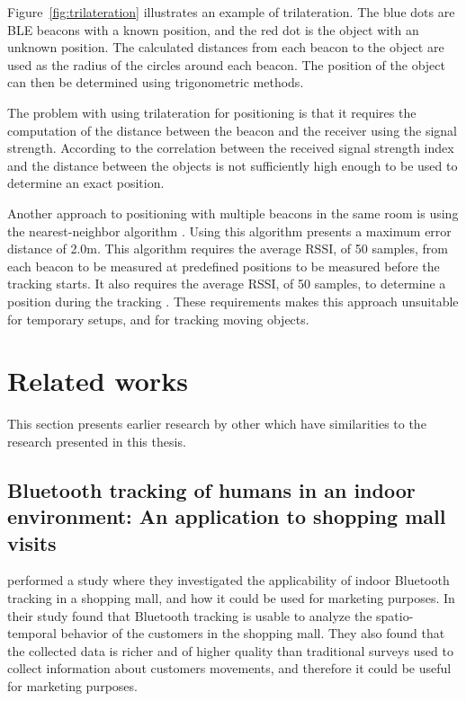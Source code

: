 \documentclass[../Main/thesis.tex]{subfiles}
\begin{document}
Figure~\ref{fig:trilateration} illustrates an example of trilateration.
The blue dots are BLE beacons with a known position, and the red dot is the object with an unknown position.
The calculated distances from each beacon to the object are used as the radius of the circles around each beacon.
The position of the object can then be determined using trigonometric methods.

The problem with using trilateration for positioning is that it requires the computation of the distance between the beacon and the receiver using the signal strength.
According to \citet{Chawathe} the correlation between the received signal strength index and the distance between the objects is not sufficiently high enough to be used to determine an exact position.

Another approach to positioning with multiple beacons in the same room is using the nearest-neighbor algorithm \citep{Takahashi2016}.
Using this algorithm \citet{Takahashi2016} presents a maximum error distance of 2.0m.
This algorithm requires the average RSSI, of 50 samples, from each beacon to be measured at predefined positions to be measured before the tracking starts.
It also requires the average RSSI, of 50 samples, to determine a position during the tracking \citep{Takahashi2016}.
These requirements makes this approach unsuitable for temporary setups, and for tracking moving objects.


\section{Related works} 
This section presents earlier research by other which have similarities to the research presented in this thesis.

\subsection{Bluetooth tracking of humans in an indoor environment: An application to shopping mall visits}
\citet{Oosterlinck2017} performed a study where they investigated the applicability of indoor Bluetooth tracking in a shopping mall, and how it could be used for marketing purposes.
In their study \citep{Oosterlinck2017} found that Bluetooth tracking is usable to analyze the spatio-temporal behavior of the customers in the shopping mall.
They also found that the collected data is richer and of higher quality than traditional surveys used to collect information about customers movements, and therefore it could be useful for marketing purposes.
\end{document}
